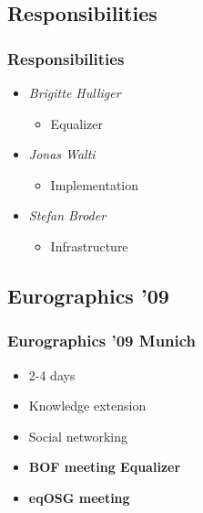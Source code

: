 \subsection{Responsibilities}
\begin{frame}\frametitle{Responsibilities}
\begin{itemize}
	\item<1-> \emph{Brigitte Hulliger} 
	\begin{itemize}
		\item Equalizer
	\end{itemize}
	\item<2-> \emph{Jonas Walti} 
	\begin{itemize}
		\item Implementation
	\end{itemize}
	\item<3-> \emph{Stefan Broder} 
	\begin{itemize}
		\item Infrastructure
	\end{itemize}
\end{itemize}
\end{frame}

\subsection{Eurographics '09}

\begin{frame}\frametitle{Eurographics '09 Munich}
	\begin{itemize}
		\item<1-> 2-4 days 
		\item<2-> Knowledge extension
		\item<3-> Social networking
		\item<4-> \textbf{BOF meeting Equalizer}
		\item<5-> \textbf{eqOSG meeting}
	\end{itemize}
\end{frame}


